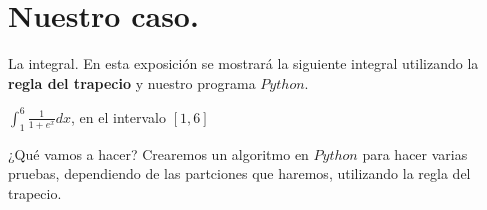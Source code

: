 \documentclass{beamer}
\begin{document}
  \section{Nuestro caso.}
  \begin{frame}
    \begin{block}{La integral.}
      En esta exposición se mostrará la siguiente integral utilizando la \textbf{regla del trapecio} y nuestro programa $Python$.\\
      \begin{center}
	$\int_{1}^{6}\frac{1}{1+e^x}dx$, en el intervalo $[1,6]$
      \end{center}
    \end{block}

    \begin{block}{¿Qué vamos a hacer?}
      Crearemos un algoritmo en \textbf{$Python$} para hacer varias pruebas, dependiendo de las partciones que haremos, utilizando la regla del trapecio.
    \end{block}
  \end{frame}


    

\end{document}
